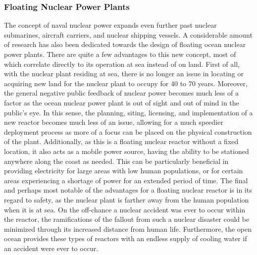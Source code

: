 \documentclass[12pt]{article}
\begin{document}
\subsubsection{Floating Nuclear Power Plants}
The concept of naval nuclear power expands even further past nuclear submarines, aircraft carriers, and nuclear shipping vessels. A considerable amount of research has also been dedicated towards the design of floating ocean nuclear power plants. There are quite a few advantages to this new concept, most of which correlate directly to its operation at sea instead of on land. First of all, with the nuclear plant residing at sea, there is no longer an issue in locating or acquiring new land for the nuclear plant to occupy for 40 to 70 years. Moreover, the general negative public feedback of nuclear power becomes much less of a factor as the ocean nuclear power plant is out of sight and out of mind in the public’s eye. In this sense, the planning, siting, licensing, and implementation of a new reactor becomes much less of an issue, allowing for a much speedier deployment process as more of a focus can be placed on the physical construction of the plant. Additionally, as this is a floating nuclear reactor without a fixed location, it also acts as a mobile power source, having the ability to be stationed anywhere along the coast as needed. This can be particularly beneficial in providing electricity for large areas with low human populations, or for certain areas experiencing a shortage of power for an extended period of time. The final and perhaps most notable of the advantages for a floating nuclear reactor is in its regard to safety, as the nuclear plant is farther away from the human population when it is at sea. On the off-chance a nuclear accident was ever to occur within the reactor, the ramifications of the fallout from such a nuclear disaster could be minimized through its increased distance from human life. Furthermore, the open ocean provides these types of reactors with an endless supply of cooling water if an accident were ever to occur.
\end{document}
